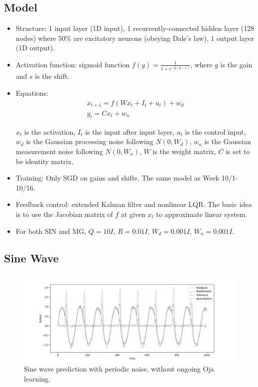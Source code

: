 \documentclass[12pt, a4paper]{article}
\begin{document}
\subsection*{Model}
\begin{itemize}
    \item Structure: 1 input layer (1D input), 1 recurrently-connected hidden layer (128 nodes) where 50\% are excitatory neurons (obeying Dale's law), 1 output layer (1D output).

    \item Activation function: sigmoid function $f(y) = \frac{1}{1 + e^{-g(y-s)}}$, where $g$ is the gain and $s$ is the shift. 
    
    \item Equations: 
    \begin{eqnarray}
    \nonumber
    x_{t+1} = f(Wx_t + I_{t} + u_{t}) + w_d \\
    \nonumber
    y_t = Cx_{t} + w_n
    \end{eqnarray}
    
    $x_t$ is the activation, $I_t$ is the input after input layer, $u_t$ is the control input, $w_d$ is the Gaussian processing noise following $N(0,W_d)$, $w_n$ is the Gaussian measurement noise following $N(0,W_n)$, $W$ is the weight matrix, $C$ is set to be identity matrix.

    \item Training: Only SGD on gains and shifts. The same model as Week 10/1-10/16.

    \item Feedback control: extended Kalman filter and nonlinear LQR. The basic idea is to use the Jacobian matrix of $f$ at given $x_t$ to approximate linear system.
    
    \item For both SIN and MG, $Q = 10I$, $R = 0.01I$, $W_d = 0.001I$, $W_n = 0.001I$.

\end{itemize}

\subsection*{Sine Wave}

\begin{figure}[H]
    \centering
    \includegraphics[width=\textwidth]{analysis/fig/1113_SIN_lqg.png}
    \caption{Sine wave prediction with periodic noise, without ongoing Oja learning.}
\end{figure}
\end{document}
